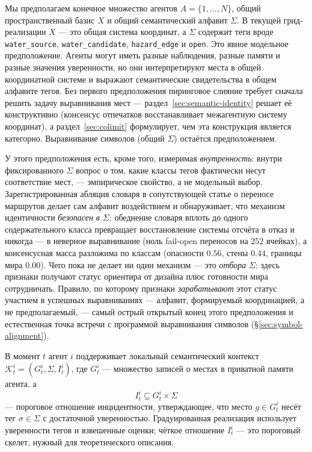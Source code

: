 \documentclass{article}
\begin{document}
Мы предполагаем конечное множество агентов $A=\{1,\ldots,N\}$, общий
пространственный базис $X$ и общий семантический алфавит $\Sigma$. В
текущей грид-реализации $X$ --- это общая система координат, а
$\Sigma$ содержит теги вроде \texttt{water\_source},
\texttt{water\_candidate}, \texttt{hazard\_edge} и \texttt{open}. Это
явное модельное предположение. Агенты могут иметь разные наблюдения,
разные памяти и разные значения уверенности, но они интерпретируют
места в общей координатной системе и выражают семантические
свидетельства в общем алфавите тегов. Без первого предположения
пиринговое слияние требует сначала решить задачу выравнивания мест ---
раздел~\ref{sec:semantic-identity} решает её конструктивно (консенсус
отпечатков восстанавливает межагентную систему координат), а
раздел~\ref{sec:colimit} формулирует, чем эта конструкция является
категорно. Выравнивание символов (общий $\Sigma$) остаётся
предположением.

У этого предположения есть, кроме того, измеримая \emph{внутренность}:
внутри фиксированного $\Sigma$ вопрос о том, какие классы тегов
фактически несут соответствие мест, --- эмпирическое свойство, а не
модельный выбор. Зарегистрированная абляция словаря в сопутствующей
статье о переносе маршрутов делает сам алфавит воздействием и
обнаруживает, что механизм идентичности \emph{безопасен в $\Sigma$}:
обеднение словаря вплоть до одного содержательного класса превращает
восстановление системы отсчёта в отказ и никогда --- в неверное
выравнивание (ноль fail-open переносов на $252$ ячейках), а
консенсусная масса разложима по классам (опасности $0.56$, стены
$0.44$, границы мира $0.00$). Чего пока не делает ни один механизм ---
это \emph{отбора} $\Sigma$: здесь признаки получают статус ориентира
от дизайна плюс готовности мира сотрудничать. Правило, по которому
признаки \emph{зарабатывают} этот статус участием в успешных
выравниваниях --- алфавит, формируемый координацией, а не
предполагаемый, --- самый острый открытый конец этого предположения и
естественная точка встречи с программой выравнивания символов
(\S\ref{sec:symbol-alignment}).

В момент $t$ агент $i$ поддерживает локальный семантический контекст
$\mathcal{K}_t^i=(G_t^i,\Sigma,I_t^i)$, где $G_t^i$ --- множество
записей о местах в приватной памяти агента, а
\[
I_t^i \subseteq G_t^i \times \Sigma
\]
--- пороговое отношение инцидентности, утверждающее, что место $g\in
G_t^i$ несёт тег $\sigma\in\Sigma$ с достаточной уверенностью.
Градуированная реализация использует уверенности тегов и взвешенные
оценки; чёткое отношение $I_t^i$ --- это пороговый скелет, нужный для
теоретического описания.
\end{document}
